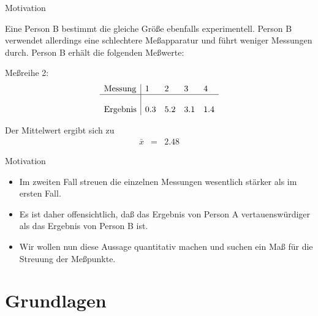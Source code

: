 \documentclass[german]{beamer}
\newcommand{\bq}{\begin{eqnarray*}}
\newcommand{\eq}{\end{eqnarray*}}
\begin{document}
\begin{frame}{Motivation}

Eine Person B bestimmt die gleiche Gr\"o{\ss}e ebenfalls experimentell.
Person B verwendet allerdings eine schlechtere Me{\ss}apparatur und f\"uhrt weniger Messungen durch.
Person B erh\"alt die folgenden Me{\ss}werte:

\vspace*{2mm}
{\footnotesize
Me{\ss}reihe 2:
\bq
\begin{array}{l|llll}
\mbox{Messung}  & 1   & 2   & 3   & 4   \\
\hline \\
\mbox{Ergebnis} & 0.3 & 5.2 & 3.1 & 1.4 \\
\end{array}
\eq
}

Der Mittelwert ergibt sich zu
\bq
 \bar{x} & = & 2.48
\eq

\end{frame}

\begin{frame}{Motivation}

\begin{itemize}
\item Im zweiten Fall streuen die einzelnen Messungen wesentlich st\"arker als im ersten Fall.

\item Es ist daher offensichtlich, da{\ss} das Ergebnis von Person A vertauensw\"urdiger als das 
Ergebnis von Person B ist. 

\item Wir wollen nun diese Aussage quantitativ machen und suchen ein
Ma{\ss} f\"ur die Streuung der Me{\ss}punkte.
\end{itemize}

\end{frame}


\section{Grundlagen}
\end{document}
